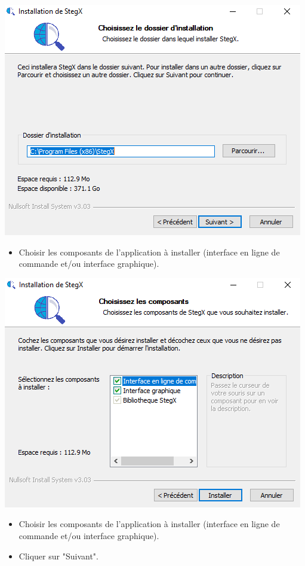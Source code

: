 \documentclass[11pt]{article}
\begin{document}
\hspace{1cm}
\includegraphics[scale=1]{pictures/taille.png}
\vspace{1cm}

\begin{itemize}
\item Choisir les composants de l'application à installer (interface 
en ligne de commande et/ou interface graphique). 
\end{itemize}

\hspace{1cm}
\includegraphics[scale=1]{pictures/choix.png}
\vspace{1cm}

\begin{itemize}
\item Choisir les composants de l'application à installer (interface 
en ligne de commande et/ou interface graphique). 
\item Cliquer sur "Suivant". 
\end{itemize}
\end{document}
